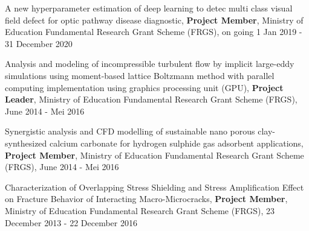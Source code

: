 \item A new hyperparameter estimation of deep learning to detec multi class visual field defect for optic pathway disease diagnostic, 
\textbf{Project Member}, Ministry of Education Fundamental Research Grant Scheme (FRGS), on going 1 Jan 2019 - 31 December 2020

\item Analysis and modeling of incompressible turbulent flow by implicit large-eddy simulations using moment-based lattice Boltzmann method with parallel computing implementation using graphics processing unit (GPU), \textbf{Project Leader}, Ministry of Education Fundamental Research Grant Scheme (FRGS), June 2014 - Mei 2016

\item Synergistic analysis and CFD modelling of sustainable nano porous clay-synthesized calcium carbonate for hydrogen sulphide gas adsorbent applications, 
\textbf{Project Member}, Ministry of Education Fundamental Research Grant Scheme (FRGS), June 2014 - Mei 2016

\item Characterization of Overlapping Stress Shielding and Stress Amplification Effect on Fracture Behavior of Interacting Macro-Microcracks, 
\textbf{Project Member}, Ministry of Education Fundamental Research Grant Scheme (FRGS), 23 December 2013 - 22 December 2016

